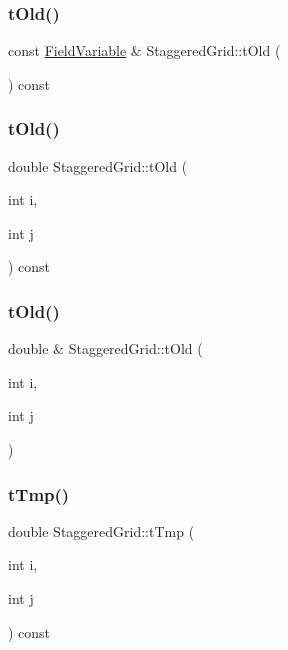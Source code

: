 \subsubsection{\texorpdfstring{tOld()}{tOld()}\hspace{0.1cm}{\footnotesize\ttfamily [1/3]}}
{\footnotesize\ttfamily const \mbox{\hyperlink{classFieldVariable}{Field\+Variable}} \& Staggered\+Grid\+::t\+Old (\begin{DoxyParamCaption}{ }\end{DoxyParamCaption}) const}

\mbox{\label{classStaggeredGrid_ad195fdf4e1ddb4eaf3a75eae717f7ab6}} 
\subsubsection{\texorpdfstring{tOld()}{tOld()}\hspace{0.1cm}{\footnotesize\ttfamily [2/3]}}
{\footnotesize\ttfamily double Staggered\+Grid\+::t\+Old (\begin{DoxyParamCaption}\item[{int}]{i,  }\item[{int}]{j }\end{DoxyParamCaption}) const}

\mbox{\label{classStaggeredGrid_a9b0a18f93fba7aec2fd57066f67cc3bd}} 
\subsubsection{\texorpdfstring{tOld()}{tOld()}\hspace{0.1cm}{\footnotesize\ttfamily [3/3]}}
{\footnotesize\ttfamily double \& Staggered\+Grid\+::t\+Old (\begin{DoxyParamCaption}\item[{int}]{i,  }\item[{int}]{j }\end{DoxyParamCaption})}

\mbox{\label{classStaggeredGrid_a6fa8586d1216d7632af4af43596755ec}} 
\subsubsection{\texorpdfstring{tTmp()}{tTmp()}\hspace{0.1cm}{\footnotesize\ttfamily [1/2]}}
{\footnotesize\ttfamily double Staggered\+Grid\+::t\+Tmp (\begin{DoxyParamCaption}\item[{int}]{i,  }\item[{int}]{j }\end{DoxyParamCaption}) const}

